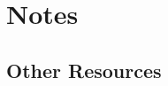 \documentclass{ltxdoc}
\begin{document}

\section{Notes}

\subsection*{Other Resources}
\end{document}
